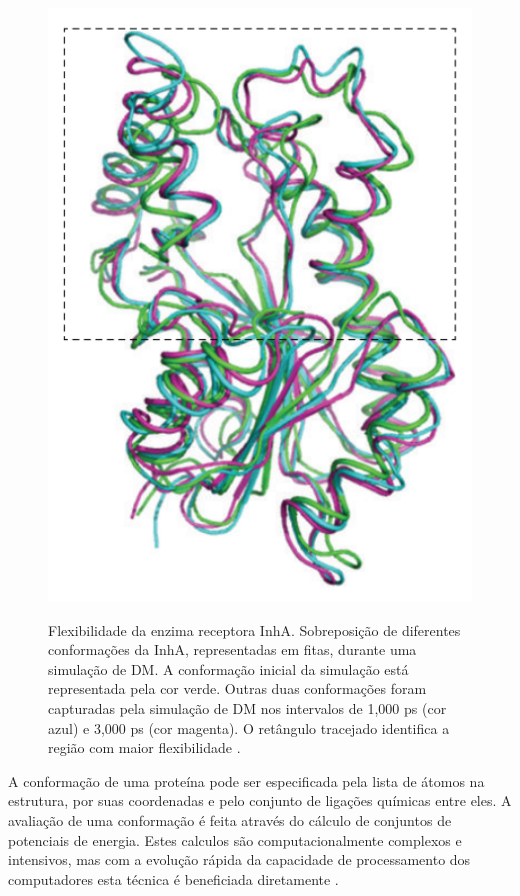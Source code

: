 \begin{figure}[h]
	\center
	\includegraphics[width=14cm]{images/dm_inha.png}
	\label{fig:dm}
	\caption{Flexibilidade da enzima receptora InhA. Sobreposição de diferentes conformações da InhA, representadas em fitas, durante uma simulação de DM. A conformação inicial da simulação está representada pela cor verde. Outras duas conformações foram capturadas pela simulação de DM nos intervalos de 1,000 ps (cor azul) e 3,000 ps (cor magenta). O retângulo tracejado identifica a região com maior flexibilidade \cite{REN13}.}
\end{figure}

A conformação de uma proteína pode ser especificada pela lista de átomos na estrutura, por suas coordenadas e pelo conjunto de ligações químicas entre eles. A avaliação de uma conformação é feita através do cálculo de conjuntos de potenciais de energia. Estes calculos são computacionalmente complexos e intensivos, mas com a evolução rápida da capacidade de processamento dos computadores esta técnica é beneficiada diretamente \cite{art08}.

